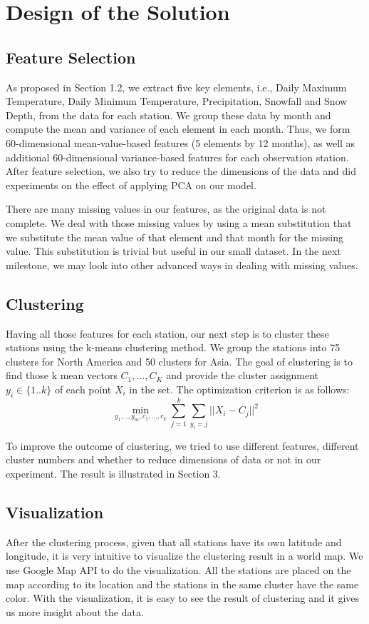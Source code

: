 \section{Design of the Solution}

\subsection{Feature Selection}
As proposed in Section 1.2, we extract five key elements, i.e., Daily Maximum Temperature, Daily Minimum Temperature, Precipitation, Snowfall and Snow Depth, from the data for each station. We group these data by month and compute the mean and variance of each element in each month. Thus, we form 60-dimensional mean-value-based features (5 elements by 12 months), as well as additional 60-dimensional variance-based features for each observation station. After feature selection, we also try to reduce the dimensions of the data and did experiments on the effect of applying PCA on our model.

There are many missing values in our features, as the original data is not complete. We deal with those missing values by using a mean substitution that we substitute the mean value of that element and that month for the missing value. This substitution is trivial but useful in our small dataset. In the next milestone, we may look into other advanced ways in dealing with missing values.

\subsection{Clustering}
Having all those features for each station, our next step is to cluster these stations using the k-means clustering method. We group the stations into 75 clusters for North America and 50 clusters for Asia. The goal of clustering is to find those k mean vectors $C_1,...,C_K$ and provide the cluster assignment $y_i\in \{1..k\}$ of each point $X_i$ in the set. The optimization criterion is as follows:
\begin{equation}
 \min_{y_1,..,y_m, c_1,...,c_k} \sum_{j=1}^{k} \sum_{y_i=j} ||X_i - C_j||^{2}
\end{equation}

To improve the outcome of clustering, we tried to use different features, different cluster numbers and whether to reduce dimensions of data or not in our experiment. The result is illustrated in Section 3. 

\subsection{Visualization}
After the clustering process, given that all stations have its own latitude and longitude, it is very intuitive to visualize the clustering result in a world map. We use Google Map API to do the visualization. All the stations are placed on the map according to its location and the stations in the same cluster have the same color. With the visualization, it is easy to see the result of clustering and it gives us more insight about the data.

